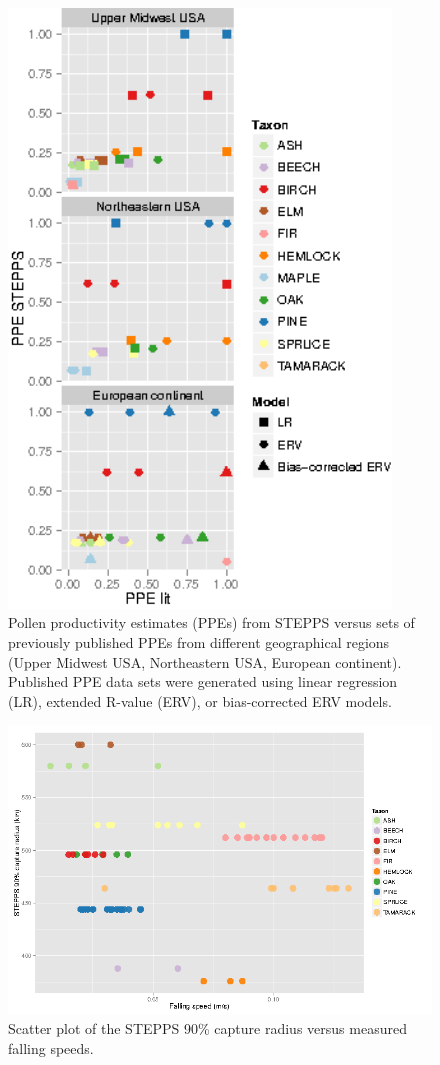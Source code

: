 \begin{figure}
\centering
\includegraphics[width=4in]{figures/PPEs_panels.png}
\caption[]{\internallinenumbers \doublespacing Pollen productivity estimates (PPEs) from STEPPS versus sets
  of previously published PPEs from different geographical regions
  (Upper Midwest USA, Northeastern USA, European continent). Published
  PPE data sets were generated using linear regression (LR), extended
  R-value (ERV), or bias-corrected ERV models.}
\label{fig:ppe}
\end{figure}

\begin{figure}
\centering
\includegraphics[width=7in]{figures/SVs_90_single.png}
\caption[]{\internallinenumbers \doublespacing Scatter plot of the STEPPS 90\% capture radius versus
  measured falling speeds.}
\label{fig:svs}
\end{figure}

